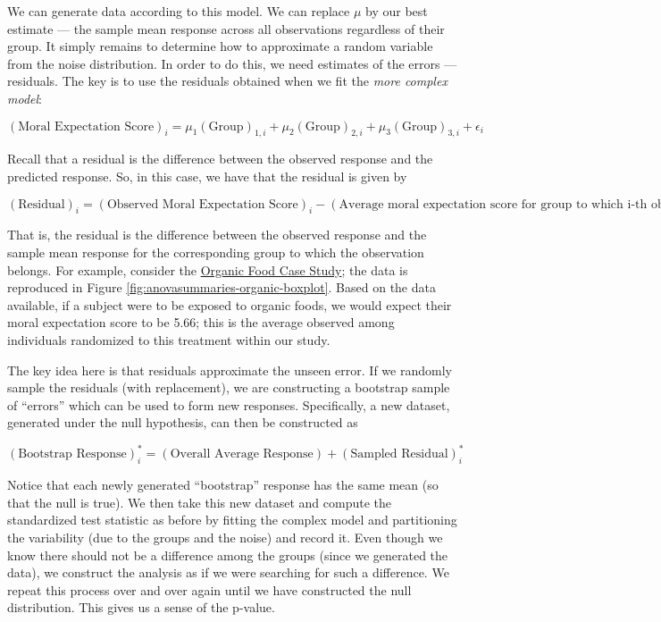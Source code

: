 \documentclass[
]{book}
\theoremstyle{plain}
\theoremstyle{mydefn}
\theoremstyle{myexmpl}
\theoremstyle{remark}
\begin{document}
We can generate data according to this model. We can replace \(\mu\) by our best estimate --- the sample mean response across all observations regardless of their group. It simply remains to determine how to approximate a random variable from the noise distribution. In order to do this, we need estimates of the errors --- residuals. The key is to use the residuals obtained when we fit the \emph{more complex model}:

\[(\text{Moral Expectation Score})_i = \mu_1 (\text{Group})_{1,i} + \mu_2 (\text{Group})_{2,i} + \mu_3 (\text{Group})_{3,i} + \epsilon_i\]

Recall that a residual is the difference between the observed response and the predicted response. So, in this case, we have that the residual is given by

\[(\text{Residual})_i = (\text{Observed Moral Expectation Score})_i - (\text{Average moral expectation score for group to which i-th observation belongs})\]

That is, the residual is the difference between the observed response and the sample mean response for the corresponding group to which the observation belongs. For example, consider the \protect\hyperlink{CaseOrganic}{Organic Food Case Study}; the data is reproduced in Figure \ref{fig:anovasummaries-organic-boxplot}. Based on the data available, if a subject were to be exposed to organic foods, we would expect their moral expectation score to be 5.66; this is the average observed among individuals randomized to this treatment within our study.

The key idea here is that residuals approximate the unseen error. If we randomly sample the residuals (with replacement), we are constructing a bootstrap sample of ``errors'' which can be used to form new responses. Specifically, a new dataset, generated under the null hypothesis, can then be constructed as

\[
(\text{Bootstrap Response})_i^* = (\text{Overall Average Response}) + (\text{Sampled Residual})_i^*
\]

Notice that each newly generated ``bootstrap'' response has the same mean (so that the null is true). We then take this new dataset and compute the standardized test statistic as before by fitting the complex model and partitioning the variability (due to the groups and the noise) and record it. Even though we know there should not be a difference among the groups (since we generated the data), we construct the analysis as if we were searching for such a difference. We repeat this process over and over again until we have constructed the null distribution. This gives us a sense of the p-value.
\end{document}

